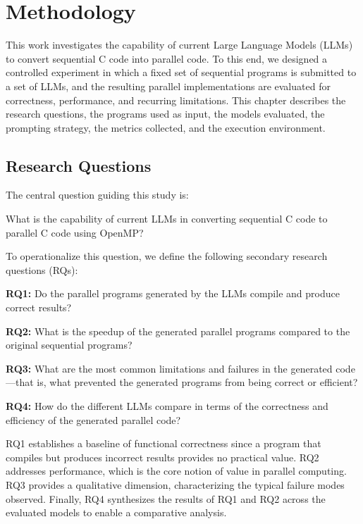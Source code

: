 \chapter{Methodology}
\label{cha:methodology}

This work investigates the capability of current Large Language Models (LLMs) to convert sequential C code into parallel code.
To this end, we designed a controlled experiment in which a fixed set of sequential programs is submitted to a set of LLMs, and the resulting parallel implementations are evaluated for correctness, performance, and recurring limitations.
This chapter describes the research questions, the programs used as input, the models evaluated, the prompting strategy, the metrics collected, and the execution environment.

\section{Research Questions}
\label{sec:rqs}

The central question guiding this study is:

\begin{citacao}
What is the capability of current LLMs in converting sequential C code to parallel C code using OpenMP?
\end{citacao}

To operationalize this question, we define the following secondary research questions (RQs):

\begin{alineas}
\item \textbf{RQ1:} Do the parallel programs generated by the LLMs compile and produce correct results?
\item \textbf{RQ2:} What is the speedup of the generated parallel programs compared to the original sequential programs?
\item \textbf{RQ3:} What are the most common limitations and failures in the generated code—that is, what prevented the generated programs from being correct or efficient?
\item \textbf{RQ4:} How do the different LLMs compare in terms of the correctness and efficiency of the generated parallel code?
\end{alineas}

RQ1 establishes a baseline of functional correctness since a program that compiles but produces incorrect results provides no practical value.
RQ2 addresses performance, which is the core notion of value in parallel computing.
RQ3 provides a qualitative dimension, characterizing the typical failure modes observed.
Finally, RQ4 synthesizes the results of RQ1 and RQ2 across the evaluated models to enable a comparative analysis.

